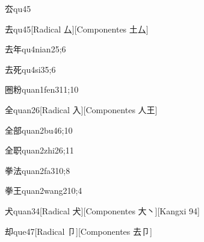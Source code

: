\begin{verbete}{厺}{qu4}{5}
\end{verbete}

\begin{verbete}{去}{qu4}{5}[Radical 厶][Componentes 土厶]
\end{verbete}

\begin{verbete}{去年}{qu4nian2}{5;6}
\end{verbete}

\begin{verbete}{去死}{qu4si3}{5;6}
\end{verbete}

\begin{verbete}{圈粉}{quan1fen3}{11;10}
\end{verbete}

\begin{verbete}{全}{quan2}{6}[Radical 入][Componentes 人王]
\end{verbete}

\begin{verbete}{全部}{quan2bu4}{6;10}
\end{verbete}

\begin{verbete}{全职}{quan2zhi2}{6;11}
\end{verbete}

\begin{verbete}{拳法}{quan2fa3}{10;8}
\end{verbete}

\begin{verbete}{拳王}{quan2wang2}{10;4}
\end{verbete}

\begin{verbete}{犬}{quan3}{4}[Radical 犬][Componentes 大丶][Kangxi 94]
\end{verbete}

\begin{verbete}{却}{que4}{7}[Radical 卩][Componentes 去卩]
\end{verbete}

